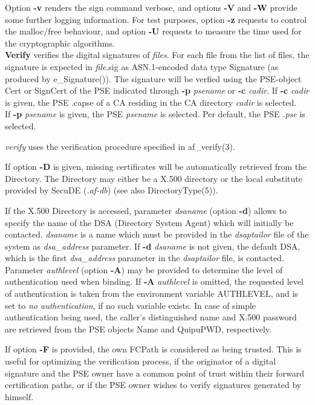 Option {\bf -v} renders the sign command verbose, and options {\bf -V} and {\bf -W} provide some further
logging information. For test purposes, option {\bf -z} requests
to control the malloc/free behaviour, and option {\bf -U} requests to measure the time used for the 
cryptographic algorithms.
\\ [1em]

{\bf Verify} verifies the digital signatures of {\em files}. For each file from the list of files, 
the signature is expected in {\em file}.sig
as ASN.1-encoded data type Signature (as produced by e\_Signature()). The signature will be verfied using 
the PSE-object Cert or SignCert
of the PSE indicated through {\bf -p} {\em psename} or {\bf -c} {\em cadir}.
If {\bf -c} {\em cadir} is given, the PSE .capse of a CA residing in the CA directory {\em cadir}
is selected. \\
If {\bf -p} {\em psename} is given, the PSE {\em psename} is selected. Per default, the PSE {\em .pse} 
is selected.

{\em verify} uses the verification procedure specified in af\_verify(3).

If option {\bf -D} is given, missing certificates will be automatically retrieved from the Directory.
The Directory may either be a X.500 directory or the local substitute provided by 
SecuDE ({\em .af-db}) (see also DirectoryType(5)).

If the X.500 Directory is accessed, parameter {\em dsaname} (option {\bf -d}) allows to specify the name of the DSA (Directory System Agent) which
will initially be contacted. {\em dsaname} is a name which must be provided in the 
{\em dsaptailor} file of the system as {\em dsa\_address} parameter. If {\bf -d} {\em dsaname} is
not given, the default DSA, which is the first {\em dsa\_address} parameter in the {\em dsaptailor} 
file, is contacted.
Parameter {\em authlevel} (option {\bf -A}) may be provided to determine the level of authentication used when binding. If {\bf -A} {\em authlevel} is omitted, the requested 
level of authentication is taken from the environment variable AUTHLEVEL, and is set to {\em no 
authentication}, if no such variable exists.
In case of simple authentication being used, the caller's distinguished name and
X.500 password are retrieved from the PSE objects Name and QuipuPWD, respectively.

If option {\bf -F} is provided, the own FCPath is considered as being trusted.
This is useful for optimizing the verification process,
if the originator of a digital signature and the PSE owner have a common point of trust
within their forward certification paths, or if the PSE owner wishes to verify signatures
generated by himself.

